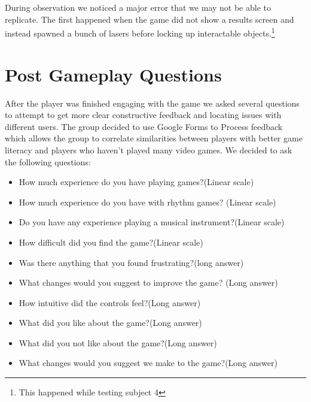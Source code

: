 \documentclass[twoside,twocolumn]{article}
\begin{document}
During observation we noticed a major error that we may not be able to replicate.
The first happened when the game did not show a results screen and instead spawned a bunch of lasers
before locking up interactable objects.\footnote{This happened while testing subject 4}




\section{Post Gameplay Questions}
After the player was finished engaging with the game we asked several questions to
attempt to get more clear constructive feedback and locating issues with different
 users. The group decided to use Google Forms to Process feedback which allows the group
 to correlate similarities between players with better game literacy and players who haven't played many video games. We decided to ask the following questions:

\begin{itemize}
\item How much experience do you have playing games?(Linear scale)
\item How much experience do you have with rhythm games? (Linear scale)
\item Do you have any experience playing a musical instrument?(Linear scale)
\item How difficult did you find the game?(Linear scale)
\item Was there anything that you found frustrating?(long answer)
\item What changes would you suggest to improve the game? (Long answer)
\item How intuitive did the controls feel?(Long answer)
\item What did you like about the game?(Long answer)
\item What did you not like about the game?(Long answer)
\item What changes would you suggest we make to the game?(Long answer)
\end{itemize}





 

\end{document}
